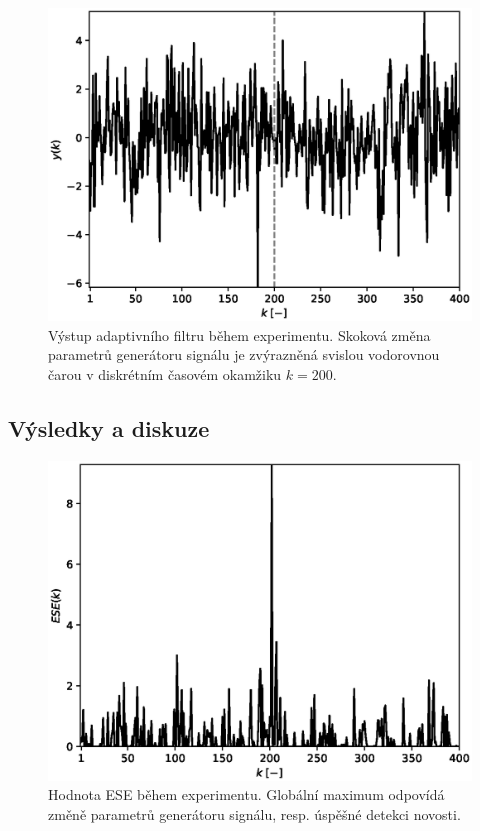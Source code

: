 \begin{figure}[h!]

	\centering
	\includegraphics[scale=0.74]{IMG/appel_par/par_output.eps}
	\caption{Výstup adaptivního filtru během experimentu. Skoková změna parametrů generátoru signálu je zvýrazněná svislou vodorovnou čarou v diskrétním časovém okamžiku $k=200$.}
		\label{fig:par_output}
\end{figure}

\subsection{Výsledky a diskuze}


\begin{figure}[h!]

	\centering
	\includegraphics[scale=0.74]{IMG/appel_par/par_ese.eps}
	\caption{Hodnota ESE během experimentu. Globální maximum odpovídá změně parametrů generátoru signálu, resp. úspěšné detekci novosti.}
		\label{fig:par_ese}
\end{figure}

